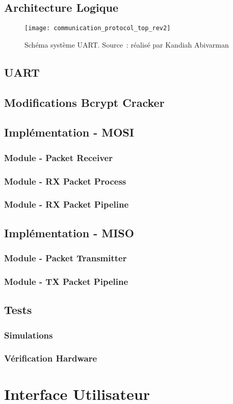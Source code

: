 \subsection{Architecture Logique}

\begin{figure}[tbph!]
	\centering
	\texttt{[image: communication\_protocol\_top\_rev2]}
	\caption[Schéma système UART - FPGA]{Schéma système UART. Source : réalisé par Kandiah Abivarman}
	\label{fig:uart_top_schematics}
\end{figure}

\subsection{UART}

\subsection{Modifications Bcrypt Cracker}

\subsection{Implémentation - MOSI}
\subsubsection{Module - Packet Receiver}
\subsubsection{Module - RX Packet Process}
\subsubsection{Module - RX Packet Pipeline}

\subsection{Implémentation - MISO}
\subsubsection{Module - Packet Transmitter}
\subsubsection{Module - TX Packet Pipeline}

\subsection{Tests}
\subsubsection{Simulations}
\subsubsection{Vérification Hardware}

\section{Interface Utilisateur}